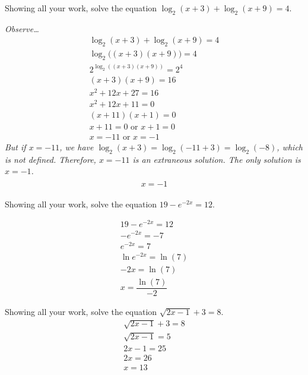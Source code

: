 \documentclass[12pt,letterpaper]{exam}
\begin{document}
\begin{questions}
\question[10] Showing all your work, solve the equation $\log_2(x + 3) + \log_2(x + 9)= 4$. \pspace

{\itshape Observe\dots
	\[
	\begin{gathered}
	\log_2(x + 3) + \log_2(x + 9)= 4 \\[0.1cm]
	\log_2 \big( (x + 3)(x + 9) \big)= 4 \\[0.1cm]
	2^{\log_2 ( (x + 3)(x + 9) )}= 2^4 \\[0.1cm]
	(x + 3)(x + 9)= 16 \\[0.1cm]
	x^2 + 12x + 27= 16 \\[0.1cm]
	x^2 + 12x + 11= 0 \\[0.1cm]
	(x + 11)(x + 1)= 0 \\[0.1cm]
	x + 11= 0 \text{ or } x + 1= 0 \\[0.1cm]
	x= -11 \text{ or } x= -1
	\end{gathered}
	\] 
But if $x= -11$, we have $\log_2(x + 3)= \log_2(-11 + 3)= \log_2(-8)$, which is not defined. Therefore, $x= -11$ is an extraneous solution. The only solution is $x= -1$.
	\[
	\boxed{\phantom{2_{2_1}^{2^1}} x= -1 \phantom{2_{2_1}^{2^1}}}
	\]
}


\question[10] Showing all your work, solve the equation $19 - e^{-2x}= 12$. \pspace

	\[
	\begin{gathered}
	19 - e^{-2x}= 12 \\[0.3cm]
	-e^{-2x}= -7 \\[0.3cm]
	e^{-2x}= 7 \\[0.3cm]
	\ln e^{-2x}= \ln(7) \\[0.3cm]
	-2x= \ln(7) \\[0.3cm]
	\boxed{x= \dfrac{\ln(7)}{-2}}
	\end{gathered}
	\] \vfill
 
 

\newpage
\question[10] Showing all your work, solve the equation $\sqrt{2x - 1} + 3= 8$. \pspace
	\[
	\begin{gathered}
	\sqrt{2x - 1} + 3= 8 \\[0.3cm]
	\sqrt{2x - 1}= 5 \\[0.3cm]
	2x - 1= 25 \\[0.3cm]
	2x= 26 \\[0.3cm]
	\boxed{x= 13}
	\end{gathered}
	\] \par\vspace{1.2cm}




\end{questions}
\end{document}
